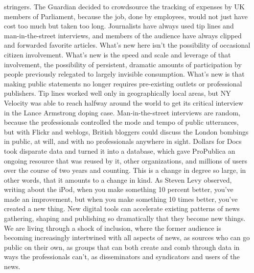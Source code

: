 stringers. The Guardian decided to crowdsource the tracking of expenses by UK
members of Parliament, because the job, done by employees, would not just have
cost too much but taken too long.
Journalists have always used tip lines and man-in-the-street interviews, and members
of the audience have always clipped and forwarded favorite articles. What’s
new here isn’t the possibility of occasional citizen involvement. What’s new is the
speed and scale and leverage of that involvement, the possibility of persistent, dramatic
amounts of participation by people previously relegated to largely invisible
consumption. What’s new is that making public statements no longer requires
pre-existing outlets or professional publishers.
Tip lines worked well only in geographically local areas, but NY Velocity was
able to reach halfway around the world to get its critical interview in the Lance
Armstrong doping case. Man-in-the-street interviews are random, because the
professionals controlled the mode and tempo of public utterances, but with Flickr
and weblogs, British bloggers could discuss the London bombings in public, at
will, and with no professionals anywhere in sight. Dollars for Docs took disparate
data and turned it into a database, which gave ProPublica an ongoing resource
that was reused by it, other organizations, and millions of users over the course
of two years and counting.
This is a change in degree so large, in other words, that it amounts to a change in
kind. As Steven Levy observed, writing about the iPod, when you make something
10 percent better, you’ve made an improvement, but when you make
something 10 times better, you’ve created a new thing. New digital tools can
accelerate existing patterns of news gathering, shaping and publishing so dramatically
that they become new things.
We are living through a shock of inclusion, where the former audience is
becoming increasingly intertwined with all aspects of news, as sources who
can go public on their own, as groups that can both create and comb through
data in ways the professionals can’t, as disseminators and syndicators and users
of the news.


